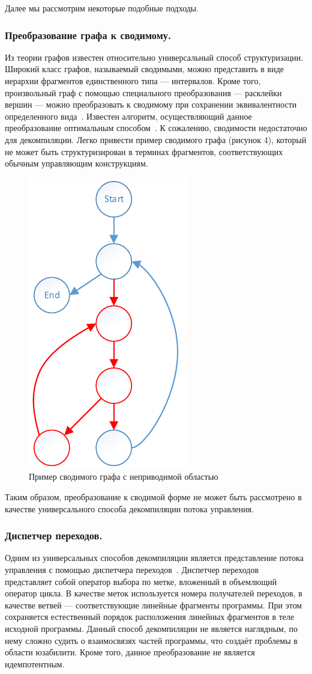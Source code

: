 Далее мы рассмотрим некоторые подобные подходы.

\subsubsection*{Преобразование графа к сводимому.}
Из теории графов известен относительно универсальный способ структуризации. Широкий класс графов, называемый сводимыми, можно представить в виде иерархии фрагментов единственного типа --- интервалов. Кроме того, произвольный граф с помощью специального преобразования --- расклейки вершин --- можно преобразовать к сводимому при сохранении эквивалентности определенного вида~\cite{hecht}. Известен алгоритм, осуществляющий данное преобразование оптимальным способом~\cite{kasyanov}. К сожалению, сводимости недостаточно для декомпиляции. Легко привести пример сводимого графа (рисунок 4), который не может быть структуризирован в терминах фрагментов, соответствующих обычным управляющим конструкциям.  

\begin{figure}[H]
\centering \includegraphics[width=0.3\linewidth]{Zabransky/graph.pdf}
\caption{Пример сводимого графа с неприводимой областью}
\end{figure}

Таким образом, преобразование к сводимой форме не может быть рассмотрено в качестве универсального способа декомпиляции потока управления.

\subsubsection*{Диспетчер переходов.}
Одним из универсальных способов декомпиляции является представление потока управления с помощью диспетчера переходов~\cite{pliss}. Диспетчер переходов представляет собой оператор выбора по метке, вложенный в объемлющий оператор цикла. В качестве меток используется номера получателей переходов, в качестве ветвей --- соответствующие линейные фрагменты программы. При этом сохраняется естественный порядок расположения линейных фрагментов в теле исходной программы. Данный способ декомпиляции не является наглядным, по нему сложно судить о взаимосвязях частей программы, что создаёт проблемы в области юзабилити. Кроме того, данное преобразование не является идемпотентным.

